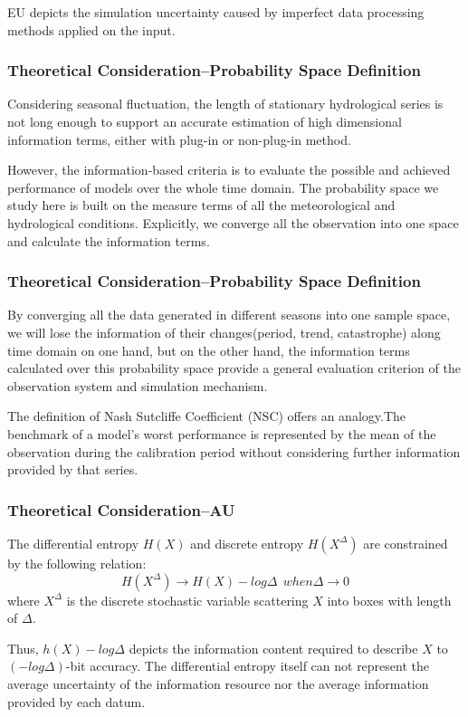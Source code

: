 \documentclass{beamer}
\begin{document}
\begin{CJK}{UTF8}{gkai}
\begin{frame}
EU depicts the simulation uncertainty caused by imperfect data processing methods applied on the input.
\end{frame}


\begin{frame}
\frametitle{Theoretical Consideration--Probability Space Definition}
Considering seasonal fluctuation, the length of stationary hydrological series is not long enough to support an accurate estimation of high dimensional information terms, either with plug-in or non-plug-in method.

However, the information-based criteria is to  evaluate the possible and achieved performance of models over the whole time domain. The probability space we study here is built on the measure terms of all the meteorological and hydrological conditions. Explicitly, we converge all the observation into one space and calculate the information terms.

 


\end{frame}

\begin{frame}
\frametitle{Theoretical Consideration--Probability Space Definition}
By converging all the data generated in different seasons into one sample space, we will lose the information of their changes(period, trend, catastrophe) along time domain on one hand, but on the other hand, the information terms calculated over this probability space provide a general evaluation criterion of the observation system and simulation mechanism.

The definition of Nash Sutcliffe Coefficient (NSC) offers an analogy.The  benchmark of a model's worst performance is represented by the mean of the observation during the calibration period without considering further information provided by that series.

\end{frame}


\begin{frame}
\frametitle{Theoretical Consideration--AU}
The differential entropy $H(X)$ and discrete entropy $H(X^\Delta)$ are constrained by the following relation:
\begin{equation*}
H(X^\Delta)\to H(X)-log\Delta~~when \Delta \to 0
\end{equation*}
where $X^\Delta$ is the discrete stochastic variable scattering $X$ into boxes with length of $\Delta$.
 
Thus, $h(X)-log\Delta $ depicts the information content required to describe $X$ to $(-log\Delta)$-bit accuracy. The differential entropy itself can not represent the average uncertainty of the information resource nor the average information provided by each datum.


\end{frame}
\end{CJK}
\end{document}
